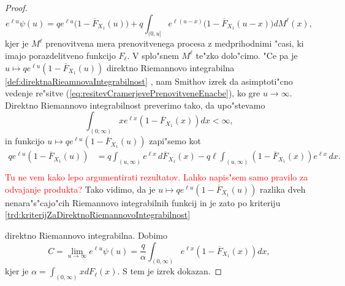 \documentclass[12pt, a4paper, reqno]{amsart}
\theoremstyle{definition}
\theoremstyle{plain}
\newcommand{\1}{\mathds{1}}
\newcommand*{\refPriloga}[1]{%
  \begingroup
    \hypersetup{
      linkcolor=red,
      linkbordercolor=red,
    }%
    \ref{#1}%
  \endgroup
}
\begin{document}
\begin{proof}
                \begin{equation}
                    e^{\ell u}\psi(u) =qe^{\ell u}\bigl(1 - \overline{F}_{X_1}(u)\bigr) +  q\int_{(0, u]}e^{\ell(u - x)}\bigl(1 - \overline{F}_{X_1}(u - x)\bigr)dM^{\ell}(x),
                    \label{eq:resitevCramerjevePrenovitveneEnacbe}
                \end{equation}
                kjer je $M^{\ell}$ prenovitvena mera prenovitvenega procesa z medprihodnimi "casi, 
                ki imajo porazdelitveno funkcijo $F_\ell$. V splo"snem $M^{\ell}$ te"zko dolo"cimo. 
                "Ce pa je $u\mapsto qe^{\ell u}(1 - \overline{F}_{X_1}(u))$ direktno Riemannovo integrabilna
                \refPriloga{def:direktnaRieamnovaIntegrabilnost}, nam 
                Smithov izrek da asimptoti"cno vedenje re"sitve (\ref{eq:resitevCramerjevePrenovitveneEnacbe}),
                ko gre $u\to\infty$.
                Direktno Riemannovo integrabilnost preverimo tako, da upo"stevamo 
                \begin{equation*}
                    \int_{(0, \infty)}xe^{\ell x}(1 - \overline{F}_{X_1}(x))dx < \infty, 
                \end{equation*}
                in funkcijo $u\mapsto qe^{\ell u}(1 - \overline{F}_{X_1}(u))$ zapi"semo kot
                \begin{align*}
                    qe^{\ell u}(1 - \overline{F}_{X_1}(u))
                     &= q\int_{(u, \infty)}e^{\ell x}\, d\overline{F}_{X_1}(x) 
                        - q\ell \int_{(u, \infty)}(1 - \overline{F}_{X_1}(x))e^{\ell x}\, dx. \\                                  
                \end{align*}
                \textcolor{red}{Tu ne vem kako lepo argumentirati rezultatov. Lahko napis"sem samo pravilo za odvajanje produkta?}
                Tako vidimo, da je $u\mapsto qe^{\ell u}(1 - \overline{F}_{X_1}(u))$ razlika dveh nenara"s"cajo"cih
                Riemannovo integrabilnih funkcij in je zato po kriteriju \refPriloga{trd:kriterijZaDirektnoRiemannovoIntegrabilnost} 
                direktno Riemannovo integrabilna. Dobimo 
                \begin{equation}
                    C = \lim_{u\to\infty}e^{\ell u}\psi(u) =  \frac{q}{\alpha} \int_{(0, \infty)}e^{\ell x}(1 - \overline{F}_{X_1}(x))dx,
                    \label{eq:CramerBoundConstant}
                \end{equation}
                kjer je $\alpha = \int_{(0, \infty)}x dF_\ell(x)$. S tem je izrek dokazan.
            \end{proof}
\end{document}
